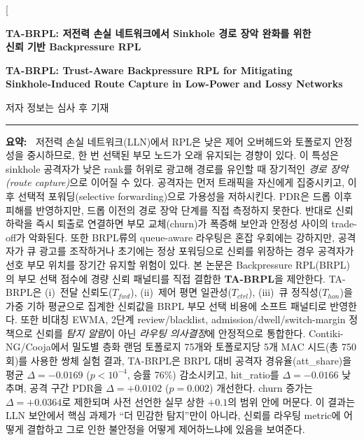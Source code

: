 \documentclass[10pt,a4paper,twocolumn]{article}
\newcommand{\koabstract}[1]{%
  \small\textbf{요약:~}#1\par}
\begin{document}
\twocolumn[{%
\begin{center}
{\fontsize{14}{17}\bfseries
TA-BRPL: 저전력 손실 네트워크에서 Sinkhole 경로 장악 완화를 위한\\
신뢰 기반 Backpressure RPL\par}
\vspace{4pt}
{\fontsize{11}{14}\bfseries
TA-BRPL: Trust-Aware Backpressure RPL for Mitigating\\
Sinkhole-Induced Route Capture in Low-Power and Lossy Networks\par}
\vspace{6pt}
{\small 저자 정보는 심사 후 기재\par}
\vspace{8pt}
\hrule\vspace{6pt}

\begin{minipage}{0.96\textwidth}
\koabstract{%
저전력 손실 네트워크(LLN)에서 RPL은 낮은 제어 오버헤드와 토폴로지 안정성을 중시하므로,
한 번 선택된 부모 노드가 오래 유지되는 경향이 있다.
이 특성은 sinkhole 공격자가 낮은 rank를 허위로 광고해 경로를 유인할 때
장기적인 \emph{경로 장악(route capture)}으로 이어질 수 있다.
공격자는 먼저 트래픽을 자신에게 집중시키고,
이후 선택적 포워딩(selective forwarding)으로 가용성을 저하시킨다.
PDR은 드롭 이후 피해를 반영하지만, 드롭 이전의 경로 장악 단계를 직접 측정하지 못한다.
반대로 신뢰 하락을 즉시 퇴출로 연결하면 부모 교체(churn)가 폭증해
보안과 안정성 사이의 trade-off가 악화된다.
또한 BRPL류의 queue-aware 라우팅은 혼잡 우회에는 강하지만,
공격자가 큐 광고를 조작하거나 초기에는 정상 포워딩으로 신뢰를 위장하는 경우
공격자가 선호 부모 위치를 장기간 유지할 위험이 있다.
본 논문은 Backpressure RPL(BRPL)의 부모 선택 점수에
경량 신뢰 패널티를 직접 결합한 \textbf{TA-BRPL}을 제안한다.
TA-BRPL은 (i)~전달 신뢰도($T_{fwd}$), (ii)~제어 평면 일관성($T_{ctrl}$),
(iii)~큐 정직성($T_{hon}$)을 가중 기하 평균으로 집계한 신뢰값을
BRPL 부모 선택 비용에 소프트 패널티로 반영한다.
또한 비대칭 EWMA, 2단계 review/blacklist, admission/dwell/switch-margin 정책으로
신뢰를 \emph{탐지 알람}이 아닌 \emph{라우팅 의사결정}에 안정적으로 통합한다.
Contiki-NG/Cooja에서 밀도별 층화 랜덤 토폴로지 75개와
토폴로지당 5개 MAC 시드(총 750회)를 사용한 쌍체 실험 결과,
TA-BRPL은 BRPL 대비 공격자 경유율(att\_share)을
평균 $\Delta = -0.0169$ ($p < 10^{-4}$, 승률 76\%) 감소시키고,
hit\_ratio를 $\Delta = -0.0166$ 낮추며,
공격 구간 PDR을 $\Delta = +0.0102$ ($p = 0.002$) 개선한다.
churn 증가는 $\Delta = +0.0364$로 제한되며
사전 선언한 실무 상한 $+0.1$의 범위 안에 머문다.
이 결과는 LLN 보안에서 핵심 과제가 ``더 민감한 탐지''만이 아니라,
신뢰를 라우팅 metric에 어떻게 결합하고 그로 인한 불안정을 어떻게 제어하느냐에 있음을 보여준다.}
\vspace{4pt}


\end{minipage}
\end{center}}
\end{document}
